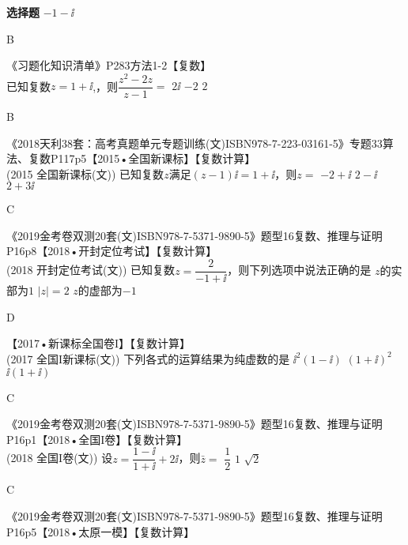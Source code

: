 \begin{exercise}{\bf 选择题}
         {$-1-\ii$}
        \begin{answer}
          B
        \end{answer}
    \item 《习题化知识清单》P283方法1-2【复数】\\
      已知复数$z=1+\ii$,，则$\dfrac{z^2-2z}{z-1}=$\xz
      \xx{$-2\ii$}
       {$2\ii$}
       {$-2$}
       {$2$}
      \begin{answer}
        B
      \end{answer}
    \item 《2018天利38套：高考真题单元专题训练(文)ISBN978-7-223-03161-5》专题33算法、复数P117p5【2015•全国新课标】【复数计算】\\
        {\kaishu (2015 \textbullet 全国新课标(文))}
        已知复数$z$满足$(z-1)\ii=1+\ii$，则$z=$\xz
         {$-2+\ii$}
         {$2-\ii$}
         {$2+3\ii$}
        \begin{answer}
          C
        \end{answer}
    \item 《2019金考卷双测20套(文)ISBN978-7-5371-9890-5》题型16复数、推理与证明P16p8【2018•开封定位考试】【复数计算】\\
        {\kaishu (2018 \textbullet 开封定位考试(文))}
        已知复数$z=\dfrac{2}{-1+\ii}$，则下列选项中说法正确的是\xz
         {$z$的实部为$1$}
         {$|z|=2$}
         {$z$的虚部为$-1$}
        \begin{answer}
          D
        \end{answer}
    \item 【2017•新课标全国卷I】【复数计算】\\
        {\kaishu (2017 \textbullet 全国I新课标(文))}
        下列各式的运算结果为纯虚数的是\xz
         {$\ii^2(1-\ii)$}
         {$(1+\ii)^2$}
         {$\ii(1+\ii)$}
        \begin{answer}
          C
        \end{answer}
    \item 《2019金考卷双测20套(文)ISBN978-7-5371-9890-5》题型16复数、推理与证明P16p1【2018•全国I卷】【复数计算】\\
        {\kaishu (2018 \textbullet 全国I卷(文))}
        设$z=\dfrac{1-\ii}{1+\ii}+2\ii$，则$\bar z=$\xz
         {$\dfrac12$}
         {$1$}
         {$\sqrt2$}
        \begin{answer}
          C
        \end{answer}
    \item 《2019金考卷双测20套(文)ISBN978-7-5371-9890-5》题型16复数、推理与证明P16p5【2018•太原一模】【复数计算】\\

\end{exercise}

